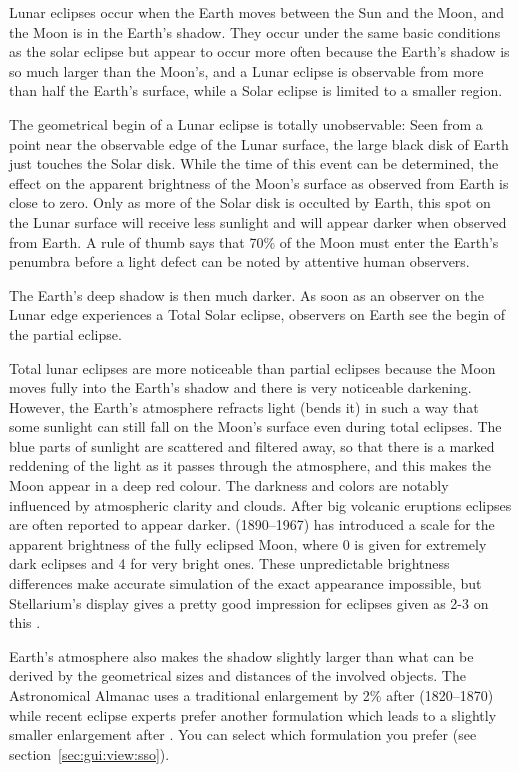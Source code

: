 Lunar eclipses occur when the Earth moves between the Sun and the Moon,
and the Moon is in the Earth's shadow. They occur under the same basic
conditions as the solar eclipse but appear to occur more often because the
Earth's shadow is so much larger than the Moon's, and a Lunar eclipse is
observable from more than half the Earth's surface, while a Solar eclipse
is limited to a smaller region.

The geometrical begin of a Lunar eclipse is totally unobservable: Seen
from a point near the observable edge of the Lunar surface, the large black
disk of Earth just touches the Solar disk. While the time of this
event can be determined, the effect on the apparent brightness of the
Moon's surface as observed from Earth is close to zero. Only as more
of the Solar disk is occulted by Earth, this spot on the Lunar surface
will receive less sunlight and will appear darker when observed from
Earth. A rule of thumb says that 70\% of the Moon must enter the
Earth's penumbra before a light defect can be noted by attentive human
observers. 

The Earth's deep shadow is then much darker. As soon as an observer on
the Lunar edge experiences a Total Solar eclipse, observers on Earth
see the begin of the partial eclipse.

Total lunar eclipses are more noticeable than partial eclipses because
the Moon moves fully into the Earth's shadow and there is very
noticeable darkening. However, the Earth's atmosphere refracts light
(bends it) in such a way that some sunlight can still fall on the Moon's
surface even during total eclipses. The blue parts of sunlight are scattered and filtered away, 
so that there is a marked reddening of the light as it passes through the atmosphere, and this 
makes the Moon appear in a deep red colour. The darkness and colors are notably influenced by 
atmospheric clarity and clouds. After big volcanic eruptions eclipses are often reported to appear darker.
 (1890--1967) has introduced a scale for the apparent brightness of the 
fully eclipsed Moon, where 0 is given for extremely dark eclipses and 4 for very bright ones. 
These unpredictable brightness differences make accurate simulation of the exact appearance impossible, 
but Stellarium's display gives a pretty good impression for eclipses given as 2-3 on this . 

Earth's atmosphere also makes the shadow slightly larger than what can
be derived by the geometrical sizes and distances of the involved
objects. The Astronomical Almanac uses a traditional enlargement by 2\% after
 (1820--1870) while recent eclipse experts prefer another
formulation which leads to a slightly smaller enlargement after  \citep{Espenak-Meeus:2009}. You
can select which formulation you prefer (see section~\ref{sec:gui:view:sso}).

